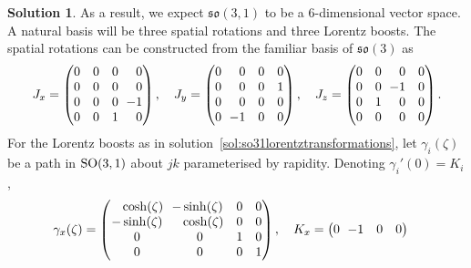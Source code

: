 \documentclass[11pt, a4paper]{report}
\theoremstyle{definition}
\newtheorem{sol}{Solution}[part]
\newcommand*{\ralminus}{\ensuremath\:\, \mathllap{-}}
\newcommand*{\SO}{\ensuremath\text{SO}}
\begin{document}
\begin{sol}
As a result, we expect $\mathfrak{so}(3, 1)$ to be a 6-dimensional vector space.
A natural basis will be three spatial rotations and three Lorentz boosts.
The spatial rotations can be constructed from the familiar basis of $\mathfrak{so}(3)$ as
\[
    J_x =
        \begin{pmatrix*}[r]
            0 & 0 & 0 & 0 \\
            0 & 0 & 0 & 0 \\
            0 & 0 & 0 & \ralminus 1 \\
            0 & 0 & 1 & 0 \\
        \end{pmatrix*}, \quad
    J_y =
        \begin{pmatrix*}[r]
            0 & 0           & 0 & 0 \\
            0 & 0           & 0 & 1 \\
            0 & 0           & 0 & 0 \\
            0 & \ralminus 1 & 0 & 0 \\
        \end{pmatrix*}, \quad
    J_z =
        \begin{pmatrix*}[r]
            0 & 0 & 0           & 0 \\
            0 & 0 & \ralminus 1 & 0 \\
            0 & 1 & 0           & 0 \\
            0 & 0 & 0           & 0 \\
        \end{pmatrix*}.
\]
For the Lorentz boosts as in solution~\ref{sol:so31lorentztransformations}, let $\gamma_i(\zeta)$ be a path in $\SO(3, 1)$ about $jk$ parameterised by rapidity.
Denoting $\gamma_i'(0) = K_i$,
\begin{align*}
    \gamma_x(\zeta) &=
        \begin{pmatrix}
            \phantom{-}\cosh(\zeta) & \ralminus\sinh(\zeta)           & 0 & 0 \\
            -\sinh(\zeta)           & \phantom{\ralminus}\cosh(\zeta) & 0 & 0 \\
            0                       & 0                               & 1 & 0 \\
            0                       & 0                               & 0 & 1
        \end{pmatrix}, \quad
        K_x = \begin{pmatrix*}[r]
            0  & \ralminus 1 & 0 & 0 \\

\end{pmatrix*}
\end{align*}
\end{sol}
\end{document}
